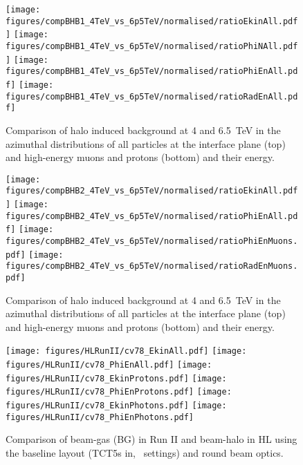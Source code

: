 \begin{figure}
\begin{center}
  \texttt{[image: figures/compBHB1\_4TeV\_vs\_6p5TeV/normalised/ratioEkinAll.pdf]}
  \texttt{[image: figures/compBHB1\_4TeV\_vs\_6p5TeV/normalised/ratioPhiNAll.pdf]}
  \texttt{[image: figures/compBHB1\_4TeV\_vs\_6p5TeV/normalised/ratioPhiEnAll.pdf]}
  \texttt{[image: figures/compBHB1\_4TeV\_vs\_6p5TeV/normalised/ratioRadEnAll.pdf]}

\end{center}
\vspace{-0.6cm}
 \caption{Comparison of halo induced background at 4 and 6.5~TeV in the azimuthal distributions of all particles at the interface plane (top) and high-energy muons and protons (bottom) and their energy.
  \label{compBHB1run1run22}}
\end{figure}


\begin{figure}%
\begin{center}
  \texttt{[image: figures/compBHB2\_4TeV\_vs\_6p5TeV/normalised/ratioEkinAll.pdf]}
  \texttt{[image: figures/compBHB2\_4TeV\_vs\_6p5TeV/normalised/ratioPhiEnAll.pdf]}
  \texttt{[image: figures/compBHB2\_4TeV\_vs\_6p5TeV/normalised/ratioPhiEnMuons.pdf]}
  \texttt{[image: figures/compBHB2\_4TeV\_vs\_6p5TeV/normalised/ratioRadEnMuons.pdf]}
\end{center}
\vspace{-0.6cm}
 \caption{Comparison of halo induced background at 4 and 6.5~TeV in the azimuthal distributions of all particles at the interface plane (top) and high-energy muons and protons (bottom) and their energy.
  \label{compBHB2run1run2}}
\end{figure}



\begin{figure}
\begin{center}
  \texttt{[image: figures/HLRunII/cv78\_EkinAll.pdf]}
  \texttt{[image: figures/HLRunII/cv78\_PhiEnAll.pdf]}
  \texttt{[image: figures/HLRunII/cv78\_EkinProtons.pdf]}
  \texttt{[image: figures/HLRunII/cv78\_PhiEnProtons.pdf]}
  \texttt{[image: figures/HLRunII/cv78\_EkinPhotons.pdf]}
  \texttt{[image: figures/HLRunII/cv78\_PhiEnPhotons.pdf]}
\end{center}
\vspace{-0.6cm}
 \caption{Comparison of beam-gas (BG) in Run II and beam-halo in HL using the baseline layout (TCT5s in, \twosigmaret~settings) and round beam optics.
  \label{fig:hlrun22}}
\end{figure}



